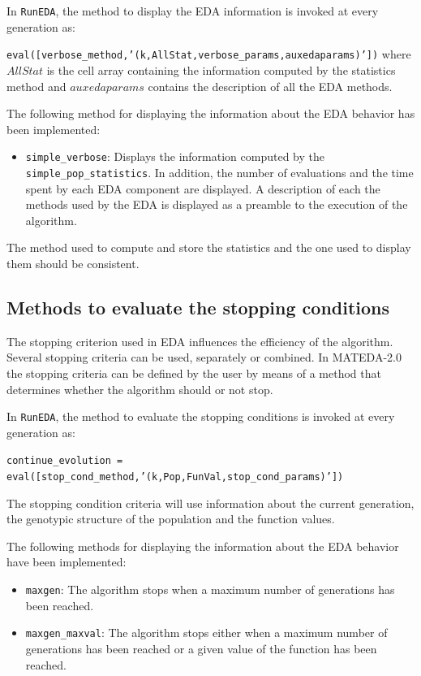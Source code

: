 \documentclass[a4paper]{article}
\begin{document}
In  \texttt{RunEDA}, the method to display the EDA information is
invoked at every generation as:

  \texttt{eval([verbose\_method,'(k,AllStat,verbose\_params,auxedaparams)'])}
where $AllStat$ is the cell array containing the information
computed by the statistics method and $auxedaparams$ contains the
description of all the EDA methods.

The following method for displaying the information about the EDA
behavior has been implemented:

\begin{itemize}
 \item  \texttt{simple\_verbose}: Displays the information computed by the \texttt{simple\_pop\_statistics}. In addition, the
  number of evaluations and the time spent by each EDA component are
  displayed. A description of each the  methods used by the EDA is displayed as a preamble to the
execution of the algorithm.
\end{itemize}

The method used to compute and store the statistics and the one used
to display them should be consistent.


\subsection{Methods to evaluate the stopping conditions}

  The stopping criterion used in EDA influences  the efficiency of the
  algorithm. Several stopping criteria can be used, separately or
  combined. In MATEDA-2.0 the stopping criteria can be defined by the
  user by means of a method that determines whether the algorithm
  should or not stop.

  In  \texttt{RunEDA}, the method to evaluate the stopping conditions is
invoked at every generation as:

\texttt{continue\_evolution
= eval([stop\_cond\_method,'(k,Pop,FunVal,stop\_cond\_params)'])}

The stopping condition criteria will use information about the
current generation, the genotypic structure of the population and
the function values.

The following methods for displaying the information about the EDA
behavior have been implemented:

\begin{itemize}
 \item \texttt{maxgen}:  The algorithm stops when a maximum number of generations has been reached.
 \item \texttt{maxgen\_maxval}:  The algorithm stops either when
 a maximum number of generations has been reached or a given  value of the function has been  reached.
\end{itemize}
\end{document}
